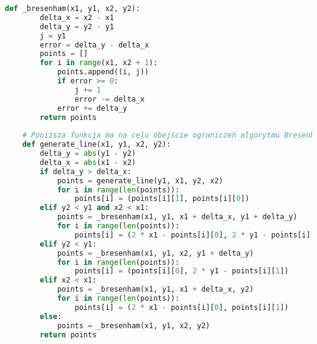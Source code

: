 \documentclass[a4paper]{article}
\begin{document}
\begin{lstlisting}[language=Python, caption=Algorytm Bresenhama, texcl=true]
    def _bresenham(x1, y1, x2, y2):
        delta_x = x2 - x1
        delta_y = y2 - y1
        j = y1
        error = delta_y - delta_x
        points = []
        for i in range(x1, x2 + 1):
            points.append((i, j))
            if error >= 0:
                j += 1
                error -= delta_x
            error += delta_y
        return points
    
    # Poniższa funkcja ma na celu obejście ograniczeń algorytmu Bresenhama, umożliwiając generowanie dowolnych linii
    def generate_line(x1, y1, x2, y2):
        delta_y = abs(y1 - y2)
        delta_x = abs(x1 - x2)
        if delta_y > delta_x:
            points = generate_line(y1, x1, y2, x2)
            for i in range(len(points)):
                points[i] = (points[i][1], points[i][0])
        elif y2 < y1 and x2 < x1:
            points = _bresenham(x1, y1, x1 + delta_x, y1 + delta_y)
            for i in range(len(points)):
                points[i] = (2 * x1 - points[i][0], 2 * y1 - points[i][1])
        elif y2 < y1:
            points = _bresenham(x1, y1, x2, y1 + delta_y)
            for i in range(len(points)):
                points[i] = (points[i][0], 2 * y1 - points[i][1])
        elif x2 < x1:
            points = _bresenham(x1, y1, x1 + delta_x, y2)
            for i in range(len(points)):
                points[i] = (2 * x1 - points[i][0], points[i][1])
        else:
            points = _bresenham(x1, y1, x2, y2)
        return points
    \end{lstlisting}
\end{document}
